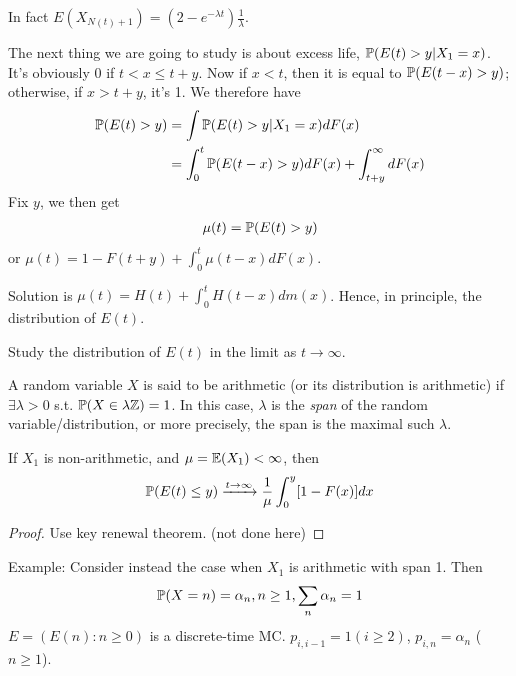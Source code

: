 \documentclass[a4paper]{article}
\begin{document}
In fact $E(X_{N(t)+1} ) = (2-e^{-\lambda t}) \frac{1}{\lambda}$.

The next thing we are going to study is about excess life, $\P(E(t)>y|X_1=x)$. It's obviously 0 if $t<x\leq t+y$. Now if $x<t$, then it is equal to $\P(E(t-x) > y)$; otherwise, if $x>t+y$, it's 1. We therefore have
\begin{equation*}
\begin{aligned}
\P(E(t)>y) &= \int \P(E(t) >y | X_1=x) dF(x)\\
&= \int_0^t \P(E(t-x)>y) dF(x)+ \int_{t+y}^\infty dF(x)
\end{aligned}
\end{equation*}
Fix $y$, we then get
\begin{equation*}
\begin{aligned}
\mu(t) = \P(E(t)>y)
\end{aligned}
\end{equation*}
or $\mu(t)=1-F(t+y) + \int_0^t \mu(t-x) d F(x)$.

Solution is $\mu(t) = H(t) + \int_0^t H(t-x) dm(x)$. Hence, in principle, the distribution of $E(t)$.

Study the distribution of $E(t)$ in the limit as $t \to \infty$.

A random variable $X$ is said to be arithmetic (or its distribution is arithmetic) if $\exists \lambda > 0$ s.t. $\P(X \in \lambda \Z) = 1$. In this case, $\lambda$ is the \emph{span} of the random variable/distribution, or more precisely, the span is the maximal such $\lambda$.

\begin{thm}
If $X_1$ is non-arithmetic, and $\mu = \E(X_1) < \infty$, then
\begin{equation*}
\begin{aligned}
\P(E(t) \leq y) \xrightarrow{t \to \infty} \frac{1}{\mu} \int_0^y [1-F(x)] dx
\end{aligned}
\end{equation*}
\begin{proof}
Use key renewal theorem. (not done here)
\end{proof}
\end{thm}

Example: Consider instead the case when $X_1$ is arithmetic with span 1. Then
\begin{equation*}
\begin{aligned}
\P(X=n) = \alpha_n,n\geq 1, \sum_n \alpha_n = 1
\end{aligned}
\end{equation*}
$E = (E(n):n \geq 0)$ is a discrete-time MC. $p_{i,i-1} = 1 (i \geq 2)$, $p_{i,n} = \alpha_n$ ($n \geq 1$).
\end{document}
